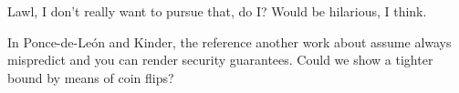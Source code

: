 \documentclass[11pt,conference]{IEEEtran}
\begin{document}
Lawl, I don't really want to pursue that, do I?
Would be hilarious, I think.

In Ponce-de-León and Kinder\cite{cats2022}, the reference another work about assume always mispredict and you can render security guarantees.
Could we show a tighter bound by means of coin flips?




\end{document}
